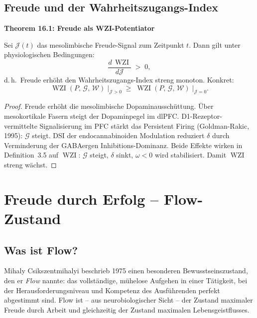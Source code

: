﻿\documentclass[12pt,a4paper]{report}
\theoremstyle{plain}
\theoremstyle{definition}
\theoremstyle{remark}
\DeclareMathOperator{\WZI}{WZI}
\begin{document}
	\subsection{Freude und der Wahrheitszugangs-Index}

	
	\noindent\textbf{Theorem 16.1: Freude als WZI-Potentiator}

		Sei $\mathcal{J}(t)$ das mesolimbische Freude-Signal zum Zeitpunkt $t$.
		Dann gilt unter physiologischen Bedingungen:
		\[
		\frac{d\,\WZI}{d\mathcal{J}} \;>\; 0,
		\]
		d.\,h.\ Freude erhöht den Wahrheitszugangs-Index streng monoton.
		Konkret:
		\[
		\WZI(P,\,\mathcal{G},\,\mathcal{W})
		\;\big|_{\mathcal{J} > 0}
		\;\geq\;
		\WZI(P,\,\mathcal{G},\,\mathcal{W})
		\;\big|_{\mathcal{J} = 0}.
		\]


	\begin{proof}
		Freude erhöht die mesolimbische Dopaminausschüttung.
		Über mesokortikale Fasern steigt der Dopaminpegel im dlPFC.
		D1-Rezeptor-vermittelte Signalisierung im PFC stärkt
		das Persistent Firing (Goldman-Rakic, 1995): $\mathcal{G}$ steigt.
		DSI der endocannabinoiden Modulation reduziert $\delta$
		durch Verminderung der GABAergen Inhibitions-Dominanz.
		Beide Effekte wirken in Definition~3.5 auf $\WZI$:
		$\mathcal{G}$ steigt, $\delta$ sinkt, $\omega < 0$ wird stabilisiert.
		Damit $\WZI$ streng wächst. \hfill
	\end{proof}

	\section{Freude durch Erfolg -- Flow-Zustand}

	\subsection{Was ist Flow?}

	Mihaly Csikszentmihalyi beschrieb 1975 einen besonderen
	Bewusstseinszustand, den er \emph{Flow} nannte: das vollständige,
	mühelose Aufgehen in einer Tätigkeit, bei der Herausforderungsniveau
	und Kompetenz des Ausführenden perfekt abgestimmt sind.
	Flow ist -- aus neurobiologischer Sicht -- der Zustand maximaler
	Freude durch Arbeit und gleichzeitig der Zustand maximalen
	Lebensgeistflusses.
\end{document}
